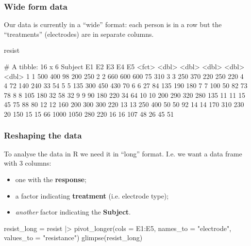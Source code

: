 \documentclass[a4paper]{article}
\begin{document}
\subsubsection{Wide form data}
Our data is currently in a ``wide'' format: each person is in a row but the ``treatments'' (electrodes) are in separate columns.
\begin{Schunk}
\begin{Sinput}
resist
\end{Sinput}
\begin{Soutput}
# A tibble: 16 x 6
   Subject    E1    E2    E3    E4    E5
   <fct>   <dbl> <dbl> <dbl> <dbl> <dbl>
 1 1         500   400    98   200   250
 2 2         660   600   600    75   310
 3 3         250   370   220   250   220
 4 4          72   140   240    33    54
 5 5         135   300   450   430    70
 6 6          27    84   135   190   180
 7 7         100    50    82    73    78
 8 8         105   180    32    58    32
 9 9          90   180   220    34    64
10 10        200   290   320   280   135
11 11         15    45    75    88    80
12 12        160   200   300   300   220
13 13        250   400    50    50    92
14 14        170   310   230    20   150
15 15         66  1000  1050   280   220
16 16        107    48    26    45    51
\end{Soutput}
\end{Schunk}
\subsubsection{Reshaping the data}
To analyse the data in R we need it in ``long'' format. I.e. we want a data frame with 3 columns:
\begin{itemize}
	\item one with the \textbf{response};
	\item a factor indicating \textcolor{mygreen}{\textbf{treatment}} (i.e. electrode type);
	\item \textit{another} factor indicating the \textcolor{myred}{\textbf{Subject}}.
\end{itemize}
\begin{Schunk}
\begin{Sinput}
resist_long = resist |> 
  pivot_longer(cols = E1:E5, 
               names_to = "electrode", 
               values_to = "resistance")
glimpse(resist_long)
\end{Sinput}
\end{Schunk}
\end{document}
